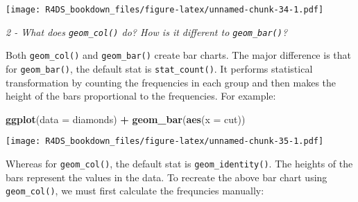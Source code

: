 \documentclass[]{article}
\newenvironment{Shaded}{\begin{snugshade}}{\end{snugshade}}
\newcommand{\KeywordTok}[1]{\textcolor[rgb]{0.13,0.29,0.53}{\textbf{#1}}}
\newcommand{\DataTypeTok}[1]{\textcolor[rgb]{0.13,0.29,0.53}{#1}}
\newcommand{\StringTok}[1]{\textcolor[rgb]{0.31,0.60,0.02}{#1}}
\newcommand{\OperatorTok}[1]{\textcolor[rgb]{0.81,0.36,0.00}{\textbf{#1}}}
\newcommand{\NormalTok}[1]{#1}
\theoremstyle{definition}
\theoremstyle{definition}
\theoremstyle{definition}
\theoremstyle{remark}
\begin{document}
\begin{Shaded}
\end{Shaded}

\texttt{[image: R4DS\_bookdown\_files/figure-latex/unnamed-chunk-34-1.pdf]}

\emph{2 - What does \texttt{geom\_col()} do? How is it different to
\texttt{geom\_bar()}?}

Both \texttt{geom\_col()} and \texttt{geom\_bar()} create bar charts.
The major difference is that for \texttt{geom\_bar()}, the default stat
is \texttt{stat\_count()}. It performs statistical transformation by
counting the frequencies in each group and then makes the height of the
bars proportional to the frequencies. For example:

\begin{Shaded}
\begin{Highlighting}[]
\KeywordTok{ggplot}\NormalTok{(}\DataTypeTok{data =}\NormalTok{ diamonds) }\OperatorTok{+}
\StringTok{  }\KeywordTok{geom_bar}\NormalTok{(}\KeywordTok{aes}\NormalTok{(}\DataTypeTok{x =}\NormalTok{ cut))}
\end{Highlighting}
\end{Shaded}

\texttt{[image: R4DS\_bookdown\_files/figure-latex/unnamed-chunk-35-1.pdf]}

Whereas for \texttt{geom\_col()}, the default stat is
\texttt{geom\_identity()}. The heights of the bars represent the values
in the data. To recreate the above bar chart using \texttt{geom\_col()},
we must first calculate the frequncies manually:
\end{document}
